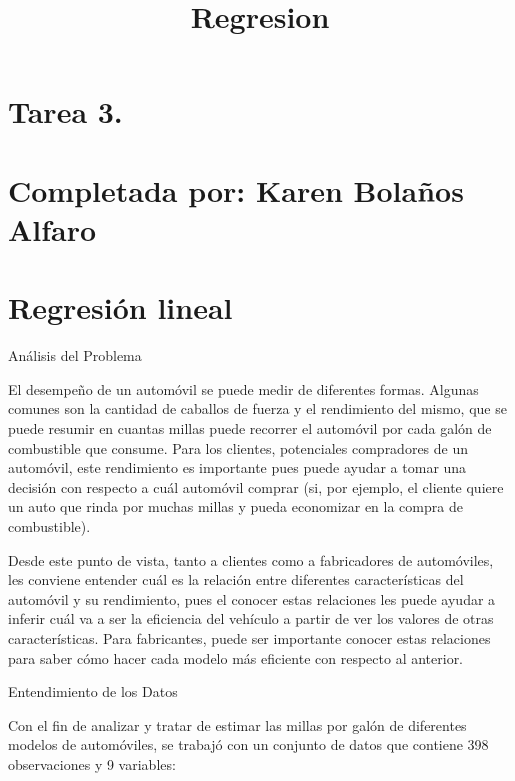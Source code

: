 \documentclass[]{article}
\title{Regresion}
\author{}
\date{}
\begin{document}
\maketitle

\hypertarget{tarea-3.}{%
\section{Tarea 3.}\label{tarea-3.}}

\hypertarget{completada-por-karen-bolanos-alfaro}{%
\section{Completada por: Karen Bolaños
Alfaro}\label{completada-por-karen-bolanos-alfaro}}

\hypertarget{regresion-lineal}{%
\section{Regresión lineal}\label{regresion-lineal}}

Análisis del Problema

El desempeño de un automóvil se puede medir de diferentes formas.
Algunas comunes son la cantidad de caballos de fuerza y el rendimiento
del mismo, que se puede resumir en cuantas millas puede recorrer el
automóvil por cada galón de combustible que consume. Para los clientes,
potenciales compradores de un automóvil, este rendimiento es importante
pues puede ayudar a tomar una decisión con respecto a cuál automóvil
comprar (si, por ejemplo, el cliente quiere un auto que rinda por muchas
millas y pueda economizar en la compra de combustible).

Desde este punto de vista, tanto a clientes como a fabricadores de
automóviles, les conviene entender cuál es la relación entre diferentes
características del automóvil y su rendimiento, pues el conocer estas
relaciones les puede ayudar a inferir cuál va a ser la eficiencia del
vehículo a partir de ver los valores de otras características. Para
fabricantes, puede ser importante conocer estas relaciones para saber
cómo hacer cada modelo más eficiente con respecto al anterior.

Entendimiento de los Datos

Con el fin de analizar y tratar de estimar las millas por galón de
diferentes modelos de automóviles, se trabajó con un conjunto de datos
que contiene 398 observaciones y 9 variables:
\end{document}
